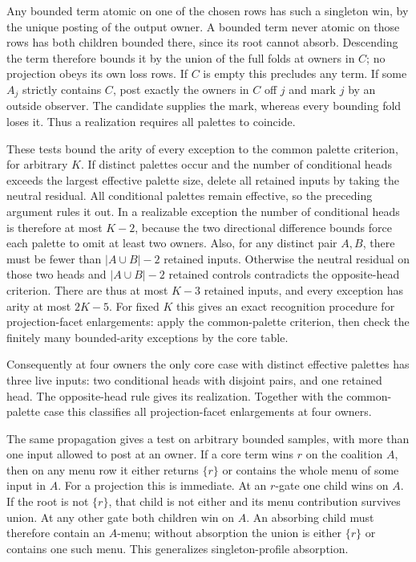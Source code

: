 Any bounded term atomic on one of the chosen rows has
such a singleton win, by the unique posting of the output
owner. A bounded term never atomic on those rows has both
children bounded there, since its root cannot absorb.
Descending the term therefore bounds it by the union of
the full folds at owners in $C$; no projection obeys its
own loss rows. If $C$ is empty this precludes any term.
If some $A_j$ strictly contains $C$, post exactly the
owners in $C$ off $j$ and mark $j$ by an outside observer.
The candidate supplies the mark, whereas every bounding
fold loses it. Thus a realization requires all palettes
to coincide.

These tests bound the arity of every exception to the common
palette criterion, for arbitrary $K$. If distinct palettes
occur and the number of conditional heads exceeds the
largest effective palette size, delete all retained inputs
by taking the neutral residual. All conditional palettes
remain effective, so the preceding argument rules it out.
In a realizable exception the number of conditional heads is
therefore at most $K-2$, because the two directional
difference bounds force each palette to omit at least two
owners. Also, for any distinct pair $A,B$, there must be
fewer than $|A\cup B|-2$ retained inputs. Otherwise the
neutral residual on those two heads and $|A\cup B|-2$
retained controls contradicts the opposite-head criterion.
There are thus at most $K-3$ retained inputs, and every
exception has arity at most $2K-5$. For fixed $K$ this gives
an exact recognition procedure for projection-facet
enlargements: apply the common-palette criterion, then
check the finitely many bounded-arity exceptions by the
core table.

Consequently at four owners the only core case with distinct
effective palettes has three live inputs: two conditional
heads with disjoint pairs, and one retained head. The
opposite-head rule gives its realization. Together with the
common-palette case this classifies all projection-facet
enlargements at four owners.

The same propagation gives a test on arbitrary bounded
samples, with more than one input allowed to post at an
owner. If a core term wins $r$ on the coalition $A$, then
on any menu row it either returns $\{r\}$ or contains
the whole menu of some input in $A$. For a projection
this is immediate. At an $r$-gate one child wins on
$A$. If the root is not $\{r\}$, that child is not either
and its menu contribution survives union. At any other
gate both children win on $A$. An absorbing child must
therefore contain an $A$-menu; without absorption the
union is either $\{r\}$ or contains one such menu.
This generalizes singleton-profile absorption.

